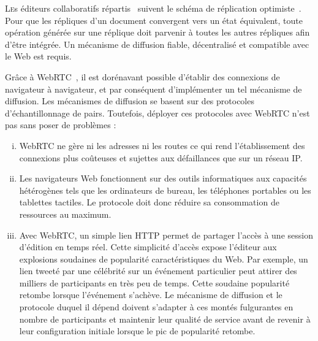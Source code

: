 

\lettrine{L}es éditeurs collaboratifs répartis~\cite{ellis1991groupware} suivent
le schéma de réplication optimiste~\cite{demers1987epidemic,
  johnson1975maintenance, ladin1992providing, saito2005optimistic}. Pour que les
répliques d'un document convergent vers un état équivalent, toute opération
générée sur une réplique doit parvenir à toutes les autres répliques afin d'être
intégrée. Un mécanisme de diffusion fiable, décentralisé et compatible avec le
Web est requis.

Grâce à WebRTC~\cite{webrtc}, il est dorénavant possible d'établir des
connexions de navigateur à navigateur, et par conséquent d'implémenter un tel
mécanisme de diffusion.
Les mécanismes de diffusion se basent sur des protocoles d'échantillonnage de
pairs. Toutefois, déployer ces protocoles avec WebRTC n'est pas sans poser de
problèmes :
\begin{enumerate}[(i)]
\item WebRTC ne gère ni les adresses ni les routes ce qui rend l'établissement
  des connexions plus coûteuses et sujettes aux défaillances que sur un réseau
  IP.
\item Les navigateurs Web fonctionnent sur des outils informatiques aux
  capacités hétérogènes tels que les ordinateurs de bureau, les téléphones
  portables ou les tablettes tactiles. Le protocole doit donc réduire sa
  consommation de ressources au maximum.
\item Avec WebRTC, un simple lien HTTP %
  permet de partager l'accès à une session d'édition en temps réel. Cette
  simplicité d'accès expose l'éditeur aux explosions soudaines de popularité
  caractéristiques du Web.  Par exemple, un lien \og tweeté \fg par une
  célébrité sur un événement particulier peut attirer des milliers de
  participants en très peu de temps. Cette soudaine popularité retombe lorsque
  l'événement s'achève.  Le mécanisme de diffusion et le protocole duquel il
  dépend doivent s'adapter à ces montés fulgurantes en nombre de participants et
  maintenir leur qualité de service avant de revenir à leur configuration
  initiale lorsque le pic de popularité retombe.
\end{enumerate}


